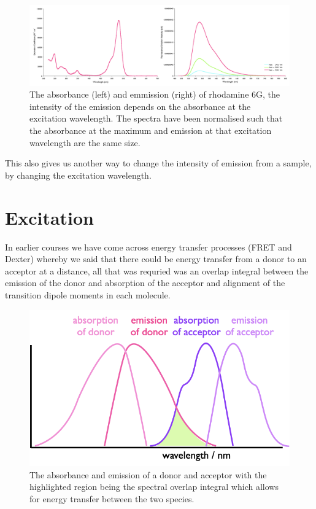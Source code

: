 \documentclass[
]{book}
\begin{document}
\begin{figure}

{\centering \includegraphics[width=8\linewidth]{images/kasha} 

}

\caption{The absorbance (left) and emmission (right) of rhodamine 6G, the intensity of the emission depends on the absorbance at the excitation wavelength. The spectra have been normalised such that the absorbance at the maximum and emission at that excitation wavelength are the same size.}\label{fig:kasha}
\end{figure}

This also gives us another way to change the intensity of emission from a sample, by changing the excitation wavelength.

\hypertarget{sec:excitation}{%
\section{Excitation}\label{sec:excitation}}

In earlier courses we have come across energy transfer processes (FRET and Dexter) whereby we said that there could be energy transfer from a donor to an acceptor at a distance, all that was requried was an overlap integral between the emission of the donor and absorption of the acceptor and alignment of the transition dipole moments in each molecule.

\begin{figure}

{\centering \includegraphics[width=0.6\linewidth]{images/FRET} 

}

\caption{The absorbance and emission of a donor and acceptor with the highlighted region being the spectral overlap integral which allows for energy transfer between the two species.}\label{fig:FRET}
\end{figure}
\end{document}
